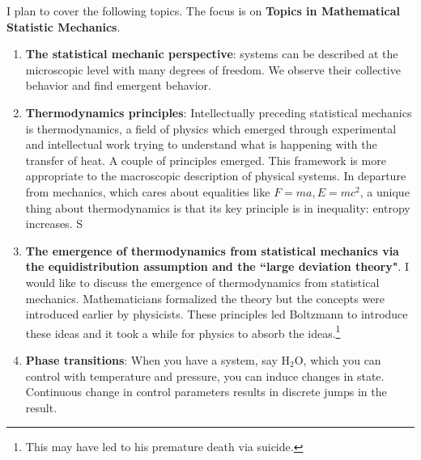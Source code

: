 \documentclass[12pt]{book}
\theoremstyle{norm}
\begin{document}
I plan to cover the following topics. The focus is on \textbf{Topics in Mathematical Statistic Mechanics}.
\begin{enumerate}
\item
\textbf{The statistical mechanic perspective}: systems can be described at the microscopic level with many degrees of freedom. We observe their collective behavior and find emergent behavior.
\item
\textbf{Thermodynamics principles}:
Intellectually preceding statistical mechanics is thermodynamics, a field of physics which emerged through experimental and intellectual work trying to understand what is happening with the transfer of heat. A couple of principles emerged. This framework is more appropriate to the macroscopic description of physical systems.
In departure from mechanics, which cares about equalities like $F=ma, E=mc^2$, a unique thing about thermodynamics is that its key principle is in inequality: entropy increases.
\be
\Delta S
\ee
\item
\textbf{The emergence of thermodynamics from statistical mechanics via the equidistribution assumption and the ``large deviation theory"}. %
I would like to discuss the emergence of thermodynamics from statistical mechanics. Mathematicians formalized the theory but the concepts were introduced earlier by physicists. These principles led Boltzmann to introduce these ideas and it took a while for physics to absorb the ideas.\footnote{This may have led to his premature death via suicide.}
\item 
\textbf{Phase transitions}: %
When you have a system, say $\text{H}_2\text{O}$, which you can control with temperature and pressure, you can induce changes in state. Continuous change in control parameters results in discrete jumps in the result. 


\end{enumerate}
\end{document}
